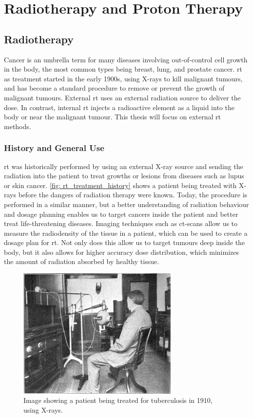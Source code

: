 \documentclass[main.tex]{subfiles}
\begin{document}
\section{Radiotherapy and Proton Therapy}

\subsection{Radiotherapy}

Cancer is an umbrella term for many diseases involving out-of-control cell growth in the body, the most common types being breast, lung, and prostate cancer\cite{cancerData}. \gls{rt} as treatment started in the early 1900s, using X-rays to kill malignant tumours, and has become a standard procedure to remove or prevent the growth of malignant tumours. External \gls{rt} uses an external radiation source to deliver the dose. In contrast, internal \gls{rt} injects a radioactive element as a liquid into the body or near the malignant tumour. This thesis will focus on external \gls{rt} methods.
 
 \subsubsection{History and General Use}
 
 \gls{rt} was historically performed by using an external X-ray source and sending the radiation into the patient to treat growths or lesions from diseases such as lupus or skin cancer. \autoref{fig: rt_treatment_history} shows a patient being treated with X-rays before the dangers of radiation therapy were known. Today, the procedure is performed in a similar manner, but a better understanding of radiation behaviour and dosage planning enables us to target cancers inside the patient and better treat life-threatening diseases. Imaging techniques such as \gls{ct}-scans allow us to measure the radiodensity of the tissue in a patient, which can be used to create a dosage plan for \gls{rt}. Not only does this allow us to target tumours deep inside the body, but it also allows for higher accuracy dose distribution, which minimizes the amount of radiation absorbed by healthy tissue.
 
  \begin{figure}[!htpb]
    \centering
    \includegraphics[width=8cm ]{images/x_ray_treatment_history.jpg}
    \caption{Image showing a patient being treated for tuberculosis in 1910, using X-rays.\cite{rt_history}}
    \label{fig: rt_treatment_history}
\end{figure}
 
\end{document}
